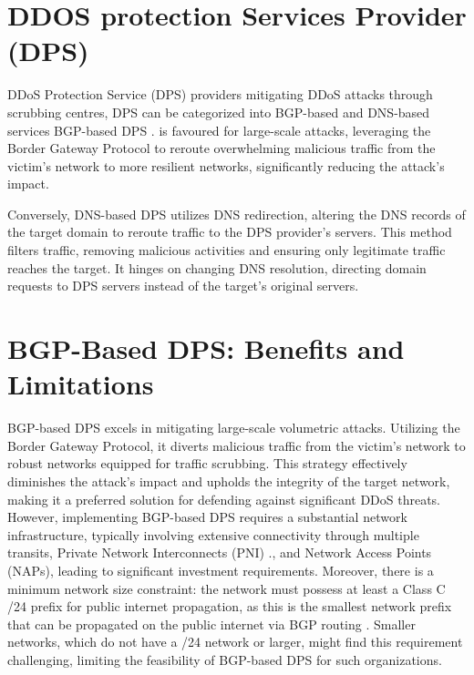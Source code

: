 \section{DDOS protection Services Provider (DPS)}\label{sec:DPS}
DDoS Protection Service (DPS) providers mitigating DDoS attacks through scrubbing centres, DPS can be categorized into BGP-based and DNS-based services BGP-based DPS \cite{ tung2018understanding}. is favoured for large-scale attacks, leveraging the Border Gateway Protocol to reroute overwhelming malicious traffic from the victim's network to more resilient networks, significantly reducing the attack's impact.

Conversely, DNS-based DPS utilizes DNS redirection, altering the DNS records of the target domain to reroute traffic to the DPS provider’s servers. This method filters traffic, removing malicious activities and ensuring only legitimate traffic reaches the target. It hinges on changing DNS resolution, directing domain requests to DPS servers instead of the target's original servers.

\section{BGP-Based DPS: Benefits and Limitations}\label{sec:BDPS_benefits}
BGP-based DPS excels in mitigating large-scale volumetric attacks. Utilizing the Border Gateway Protocol, it diverts malicious traffic from the victim's network to robust networks equipped for traffic scrubbing. This strategy effectively diminishes the attack's impact and upholds the integrity of the target network, making it a preferred solution for defending against significant DDoS threats. However, implementing BGP-based DPS requires a substantial network infrastructure, typically involving extensive connectivity through multiple transits, Private Network Interconnects (PNI) \cite{chatzis2013there}., and Network Access Points (NAPs), leading to significant investment requirements. Moreover, there is a minimum network size constraint: the network must possess at least a Class C /24 prefix for public internet propagation, as this is the smallest network prefix that can be propagated on the public internet via BGP routing \cite{caesar2005bgp}. Smaller networks, which do not have a /24 network or larger, might find this requirement challenging, limiting the feasibility of BGP-based DPS for such organizations.


